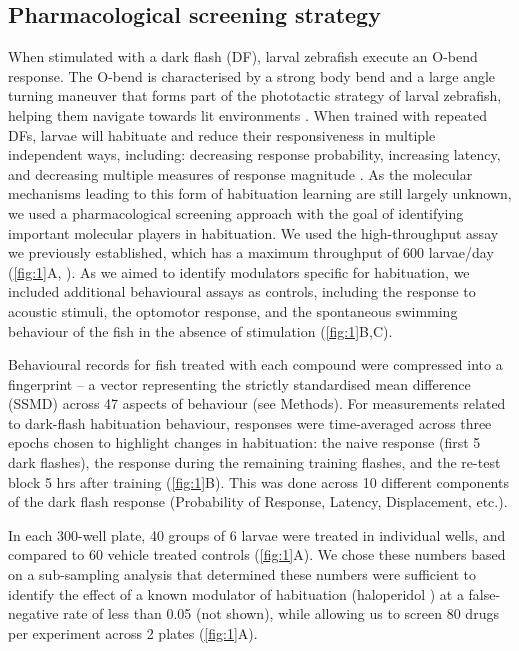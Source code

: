 \documentclass[9pt,lineno]{RandlettLab_elife}
\begin{document}
\subsection{Pharmacological screening strategy}

When stimulated with a dark flash (DF), larval zebrafish execute an O-bend response. The O-bend is characterised by a strong body bend and a large angle turning maneuver that forms part of the phototactic strategy of larval zebrafish, helping them navigate towards lit environments \cite{Burgess2007-gq, Chen2014-qq}. When trained with repeated DFs, larvae will habituate and reduce their responsiveness in multiple independent ways, including: decreasing response probability, increasing latency, and decreasing multiple measures of response magnitude \cite{Randlett2019-fi}. As the molecular mechanisms leading to this form of habituation learning are still largely unknown, we used a pharmacological screening approach with the goal of identifying important molecular players in habituation. We used the high-throughput assay we previously established, which has a maximum throughput of 600 larvae/day (\autoref{fig:1}A, \cite{Randlett2019-fi}). As we aimed to identify modulators specific for habituation, we included additional behavioural assays as controls, including the response to acoustic stimuli, the optomotor response, and the spontaneous swimming behaviour of the fish in the absence of stimulation (\autoref{fig:1}B,C). 

Behavioural records for fish treated with each compound were compressed into a fingerprint \cite{Rihel2010-pj} -- a vector representing the strictly standardised mean difference (SSMD) across 47 aspects of behaviour (see Methods). For measurements related to dark-flash habituation behaviour, responses were time-averaged across three epochs chosen to highlight changes in habituation: the naive response (first 5 dark flashes), the response during the remaining training flashes, and the re-test block 5 hrs after training (\autoref{fig:1}B). This was done across 10 different components of the dark flash response (Probability of Response, Latency, Displacement, etc.). 


In each 300-well plate, 40 groups of 6 larvae were treated in individual wells, and compared to 60 vehicle treated controls (\autoref{fig:1}A). We chose these numbers based on a sub-sampling analysis that determined these numbers were sufficient to identify the effect of a known modulator of habituation (haloperidol \cite{Randlett2019-fi}) at a false-negative rate of less than 0.05 (not shown), while allowing us to screen 80 drugs per experiment across 2 plates (\autoref{fig:1}A). 
\end{document}
